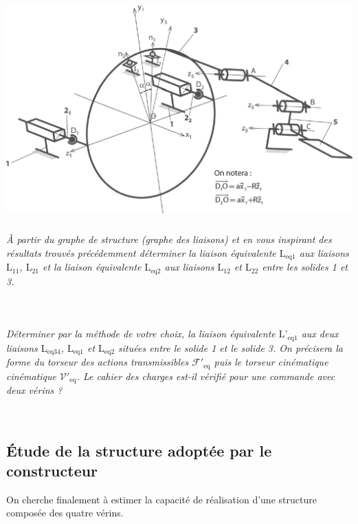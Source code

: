 \documentclass[10pt,fleqn]{article} %
\begin{document}
\begin{multicols}{2}
\begin{center}
\includegraphics[width=\linewidth]{images/fig_05}
\end{center}

\subparagraph{}\textit{À partir du graphe de structure (graphe des liaisons) et en vous inspirant des résultats trouvés précédemment déterminer la liaison équivalente $\text{L}_{\text{eq}1}$
aux liaisons $\text{L}_{11}$, $\text{L}_{21}$ et la liaison équivalente $\text{L}_{\text{eq}2}$ aux liaisons $\text{L}_{12}$ et $\text{L}_{22}$ entre les solides 1 et 3.}
\ifprof
\begin{corrige}~\\
\end{corrige}
\else
\fi


\subparagraph{}\textit{Déterminer par la méthode de votre choix, la liaison équivalente $\text{L'}_{\text{eq}1}$ aux deux liaisons $\text{L}_{\text{eq}34}$, $\text{L}_{\text{eq}1}$ et $\text{L}_{\text{eq}2}$ situées
entre le solide 1 et le solide 3. On précisera la forme du torseur des actions transmissibles $\mathcal{F}'_{\text{eq}}$ puis le torseur cinématique cinématique $\mathcal{V}'_{\text{eq}}$. Le cahier des charges est-il vérifié pour une commande avec deux vérins ?}
\ifprof
\begin{corrige}~\\
\end{corrige}
\else
\fi

\subsection*{Étude de la structure adoptée par le constructeur}
\begin{obj}
On cherche finalement à estimer la capacité de réalisation d'une structure composée des quatre
vérins.
\end{obj}






\end{multicols}
\end{document}
